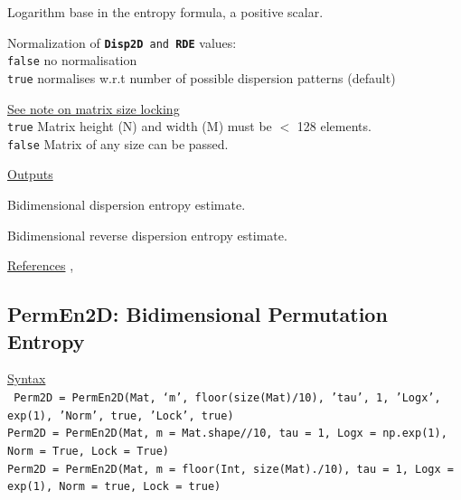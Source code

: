 \documentclass[12pt, a4paper, titlepage, openany]{book}
\begin{document}
\begin{description}[labelsep=1cm, labelwidth=2cm, nosep,,style=multiline,leftmargin=3cm]
\begin{description}[labelsep=5em, labelwidth=8em, nosep,style=multiline,leftmargin=3cm]
	\end{description}
\item[\texttt{Logx}]	Logarithm base in the entropy formula, a positive scalar.
\item[\texttt{Norm}]	Normalization of \texttt{\textbf{Disp2D} and \textbf{RDE}} values:\\
		  \texttt{false} \hspace{10pt} no normalisation \\
		  \texttt{true} \hspace{15pt} normalises w.r.t number of possible dispersion patterns (default)
\item[\texttt{Lock}]	\hyperlink{bidinote}{\ul{See note on matrix size locking}}\\
		  \texttt{true} \hspace{15pt} Matrix height (N) and width (M) must be $<$ 128 elements.\\
		  \texttt{false}\hspace{12pt} Matrix of any size can be passed.\\ 
\end{description}

\noindent \ul{Outputs}
\begin{description}[labelsep=1cm, labelwidth=2cm, nosep, style=multiline,leftmargin=3cm]\footnotesize
\item[\texttt{Dist2D}]		Bidimensional dispersion entropy estimate.
\item[\texttt{RDE}]		Bidimensional reverse dispersion entropy estimate.
\end{description}

\noindent \ul{References}\hspace{1cm}
\cite{Disp2D1},



\newpage
\subsection{\normalsize PermEn2D: \hspace{15mm} Bidimensional Permutation Entropy}\label{PermEn2D}
\noindent\ul{Syntax} \vspace{6mm} \\ \noindent \texttt{\footnotesize
Perm2D = PermEn2D(Mat, ‘m’, floor(size(Mat)/10), 'tau', 1, 'Logx', exp(1), 'Norm', true, 'Lock', true)\\
Perm2D = PermEn2D(Mat, m = Mat.shape//10, tau = 1, Logx = np.exp(1), Norm = True, Lock = True)\\
Perm2D = PermEn2D(Mat, m = floor(Int, size(Mat)./10), tau = 1, Logx = exp(1), Norm = true, Lock = true)}
\vspace{1cm}
\end{document}
